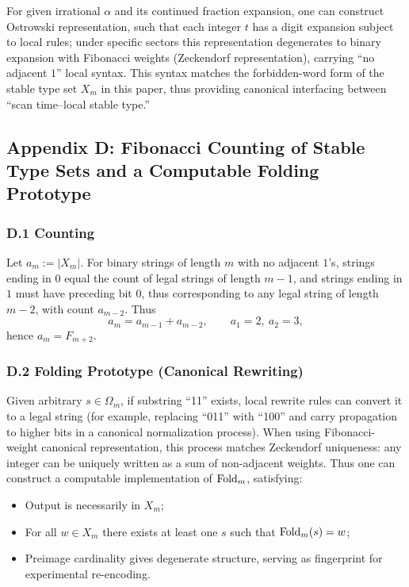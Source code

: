 For given irrational $\alpha$ and its continued fraction expansion, one can construct Ostrowski representation, such that each integer $t$ has a digit expansion subject to local rules; under specific sectors this representation degenerates to binary expansion with Fibonacci weights (Zeckendorf representation), carrying ``no adjacent $1$'' local syntax. This syntax matches the forbidden-word form of the stable type set $X_m$ in this paper, thus providing canonical interfacing between ``scan time--local stable type.''

\subsection{Appendix D: Fibonacci Counting of Stable Type Sets and a Computable Folding Prototype}

\subsubsection{D.1 Counting}

Let $a_m:=|X_m|$. For binary strings of length $m$ with no adjacent $1$'s, strings ending in $0$ equal the count of legal strings of length $m-1$, and strings ending in $1$ must have preceding bit $0$, thus corresponding to any legal string of length $m-2$, with count $a_{m-2}$. Thus
\[
a_m=a_{m-1}+a_{m-2},\qquad a_1=2,\ a_2=3,
\]
hence $a_m=F_{m+2}$.

\subsubsection{D.2 Folding Prototype (Canonical Rewriting)}

Given arbitrary $s\in\Omega_m$, if substring ``11'' exists, local rewrite rules can convert it to a legal string (for example, replacing ``011'' with ``100'' and carry propagation to higher bits in a canonical normalization process). When using Fibonacci-weight canonical representation, this process matches Zeckendorf uniqueness: any integer can be uniquely written as a sum of non-adjacent weights. Thus one can construct a computable implementation of $\mathrm{Fold}_m$, satisfying:
\begin{itemize}
  \item Output is necessarily in $X_m$;
  \item For all $w\in X_m$ there exists at least one $s$ such that $\mathrm{Fold}_m(s)=w$;
  \item Preimage cardinality gives degenerate structure, serving as fingerprint for experimental re-encoding.
\end{itemize}

